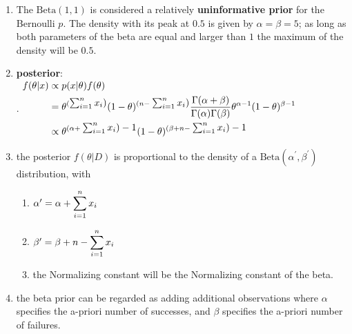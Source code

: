 \begin{enumerate}
    \item  The $\text{Beta}(1,1)$ is considered a relatively \textbf{uninformative prior} for the Bernoulli $p$.
    The density with its peak at $0.5$ is given by $\alpha = \beta = 5$; as long as both parameters of the beta are equal and larger than $1$ the maximum of the density will be $0.5$. 
    \hfill \cite{statistics/book/Statistics-for-Data-Scientists/Maurits-Kaptein}

    \item \textbf{posterior}:
    \hfill \cite{statistics/book/Statistics-for-Data-Scientists/Maurits-Kaptein}
    \\[0.2cm]
    .\hfill
    $
        \begin{aligned}
            f (\theta|x) 
            &\propto p(x|\theta) f (\theta) \\
            &= \theta^{(\textstyle\sum^n _{i=1} x_i)} (1 - \theta)^{(n-\textstyle\sum^n _{i=1} x _i)} \dfrac{\Gamma (\alpha + \beta) }{\Gamma (\alpha)\Gamma (\beta)} \theta ^{\alpha-1}(1 - \theta)^{\beta-1} \\
            &\propto \theta^{(\alpha+\textstyle\sum^n _{i=1} x _i )-1}(1 - \theta)^{ (\beta+n-\textstyle\sum^n_{ i=1} x_ i )-1}
        \end{aligned}
    $
    \hfill \cite{statistics/book/Statistics-for-Data-Scientists/Maurits-Kaptein}

    \item  the posterior $f (\theta|D)$ is proportional to the density of a $\text{Beta}(\alpha^\prime, \beta^\prime)$ distribution, with
    \hfill \cite{statistics/book/Statistics-for-Data-Scientists/Maurits-Kaptein}
    \begin{enumerate}
        \item $\alpha^\prime = \alpha + \displaystyle\sum^n _{i=1} x_ i$
        \hfill \cite{statistics/book/Statistics-for-Data-Scientists/Maurits-Kaptein}

        \item $\beta^\prime = \beta + n - \displaystyle\sum^n _{i=1} x_ i$ 
        \hfill \cite{statistics/book/Statistics-for-Data-Scientists/Maurits-Kaptein}

        \item the Normalizing constant will be the Normalizing constant of the beta.
        \hfill \cite{statistics/book/Statistics-for-Data-Scientists/Maurits-Kaptein}
    \end{enumerate}

    \item the beta prior can be regarded as adding additional observations where $\alpha$ specifies the a-priori number of successes, and $\beta$ specifies the a-priori number of failures.
    \hfill \cite{statistics/book/Statistics-for-Data-Scientists/Maurits-Kaptein}
\end{enumerate}














